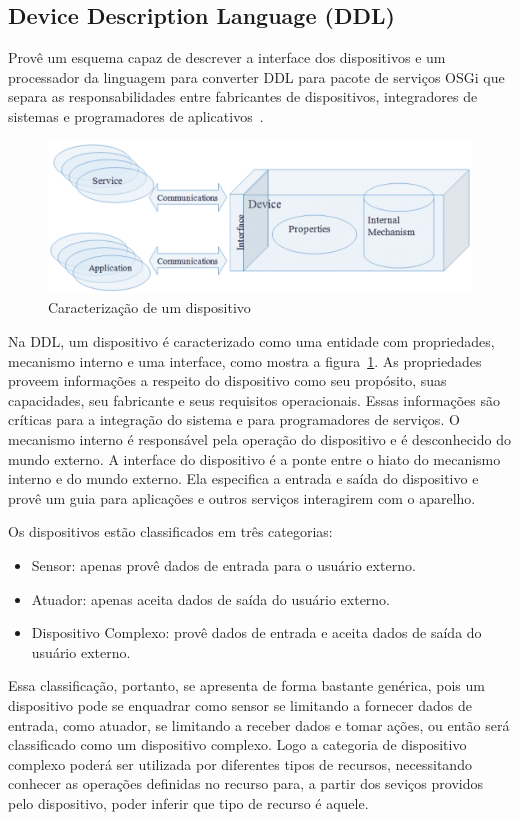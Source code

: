 \subsection{Device Description Language (DDL)}
\label{subsec:ddl}

Provê um esquema capaz de descrever a interface dos dispositivos e um processador da linguagem para converter DDL para pacote de serviços OSGi que separa as responsabilidades entre fabricantes de dispositivos, integradores de sistemas e programadores de aplicativos~\cite{gatorTechDDL}.

\begin{figure}[ht]
\center
\includegraphics[scale=0.4]{imagens/gatorDDL}
\caption{Caracterização de um dispositivo~\cite{ddlSpec}}
\label{fig:ddlspec}
\end{figure}

Na DDL, um dispositivo é caracterizado como uma entidade com propriedades, mecanismo interno e uma interface, como mostra a figura~\ref{fig:ddlspec}. As propriedades proveem informações a respeito do dispositivo como seu propósito, suas capacidades, seu fabricante e seus requisitos operacionais. Essas informações são críticas para a integração do sistema e para programadores de serviços. O mecanismo interno é responsável pela operação do dispositivo e é desconhecido do mundo externo. A interface do dispositivo é a ponte entre o hiato do mecanismo interno e do mundo externo. Ela especifica a entrada e saída do dispositivo e provê um guia para aplicações e outros serviços interagirem com o aparelho.

Os dispositivos estão classificados em três categorias:
\begin{itemize}
	\item Sensor: apenas provê dados de entrada para o usuário externo.
	\item Atuador: apenas aceita dados de saída do usuário externo.
	\item Dispositivo Complexo: provê dados de entrada e aceita dados de saída do usuário externo.
\end{itemize}

Essa classificação, portanto, se apresenta de forma bastante genérica, pois um dispositivo pode se enquadrar como sensor se limitando a fornecer dados de entrada, como atuador, se limitando a receber dados e tomar ações, ou então será classificado como um dispositivo complexo. Logo a categoria de dispositivo complexo poderá ser utilizada por diferentes tipos de recursos, necessitando conhecer as operações definidas no recurso para, a partir dos seviços providos pelo dispositivo, poder inferir que tipo de recurso é aquele.
